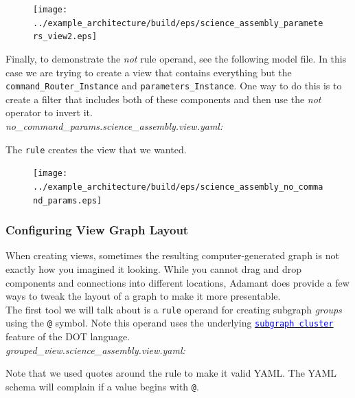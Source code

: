 \begin{figure}[H]
  \texttt{[image: ../example\_architecture/build/eps/science\_assembly\_parameters\_view2.eps]}
\end{figure}

Finally, to demonstrate the \textit{not} rule operand, see the following model file. In this case we are trying to create a view that contains everything but the \texttt{command\_Router\_Instance} and \texttt{parameters\_Instance}. One way to do this is to create a filter that includes both of these components and then use the \textit{not} operator to invert it. \\

\textit{no\_command\_params.science\_assembly.view.yaml:}

The \texttt{rule} creates the view that we wanted.

\begin{figure}[H]
  \texttt{[image: ../example\_architecture/build/eps/science\_assembly\_no\_command\_params.eps]}
\end{figure}

\subsubsection{Configuring View Graph Layout} \label{Configuring View Graph Layout}

When creating views, sometimes the resulting computer-generated graph is not exactly how you imagined it looking. While you cannot drag and drop components and connections into different locations, Adamant does provide a few ways to tweak the layout of a graph to make it more presentable. \\

The first tool we will talk about is a \texttt{rule} operand for creating subgraph \textit{groups} using the \texttt{@} symbol. Note this operand uses the underlying \href{https://www.graphviz.org/doc/info/attrs.html#d:clusterrank}{\textcolor{blue}{\texttt{subgraph cluster}}} feature of the DOT language. \\

\textit{grouped\_view.science\_assembly.view.yaml:}

Note that we used quotes around the rule to make it valid YAML. The YAML schema will complain if a value begins with \texttt{@}. \\

